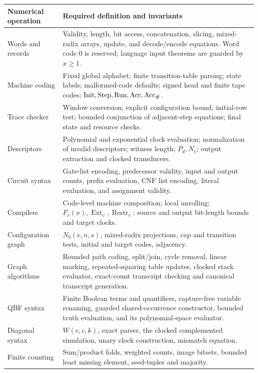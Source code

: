 \begin{longtable}{@{}>{\RaggedRight\arraybackslash}p{}>{\RaggedRight\arraybackslash}p{}@{}}
\toprule
Numerical operation & Required definition and invariants\\
\midrule
\endhead
Words and records & Validity, length, bit access, concatenation, slicing,
mixed-radix arrays, update, and decode/encode equations. Word code 0 is
reserved; language input theorems are guarded by \(x\ge1\).\\
Machine coding & Fixed global alphabet; finite transition-table parsing;
state labels; malformed-code defaults; signed head and finite tape codes;
\(\operatorname{Init},\operatorname{Step},\operatorname{Run},\operatorname{Acc},\operatorname{Acc}_{\#}\).\\
Trace checker & Window conversion; explicit configuration bound;
initial-row test; bounded conjunction of adjacent-step equations; final
state and resource checks.\\
Descriptors & Polynomial and exponential clock evaluation; normalization
of invalid descriptors; witness length; \(P_d,N_v\); output extraction and
clocked transducers.\\
Circuit syntax & Gate-list encoding, predecessor validity, input and output
counts, prefix evaluation, CNF list encoding, literal evaluation, and
assignment validity.\\
Compilers & Code-level machine composition; local unrolling;
\(F_v(x),\operatorname{Ext}_v,\operatorname{Restr}_v\); source and output
bit-length bounds and target clocks.\\
Configuration graph & \(N_0(e,n,s)\), mixed-radix projections, cap and
transition tests, initial and target codes, adjacency.\\
Graph algorithms & Bounded path coding, split/join, cycle removal, linear
marking, repeated-squaring table updates, clocked stack evaluator,
exact-count transcript checking and canonical transcript generation.\\
QBF syntax & Finite Boolean terms and quantifiers, capture-free variable
renaming, guarded shared-occurrence constructor, bounded truth evaluation,
and its polynomial-space evaluator.\\
Diagonal syntax & \(W(e,c,k)\), exact parser, the clocked complemented
simulation, unary clock construction, mismatch equation.\\
Finite counting & Sum/product folds, weighted counts, image bitsets,
bounded least missing element, seed-tuples and majority.\\
\bottomrule
\end{longtable}

